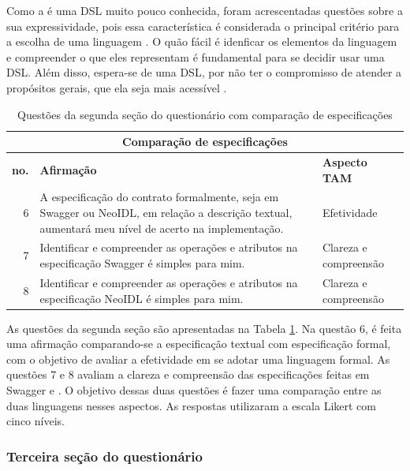 Como a \neoidl{} é uma DSL muito pouco conhecida, foram acrescentadas questões
sobre a sua expressividade, pois essa característica é considerada o principal
critério para a escolha de uma linguagem \cite{mackinlay1985expressiveness}. O
quão fácil é idenficar os elementos da linguagem e compreender o que eles
representam é fundamental para se decidir usar uma DSL. Além disso, espera-se de uma DSL, por
não ter o compromisso de atender a propósitos gerais, que ela seja mais
acessível \cite{taha2008domain}. 

\begin{table}[h]
\scriptsize
\centering
\vspace{0.5cm}
\begin{tabular}{r|p{10cm}|p{3cm}}
\multicolumn{3}{c}{{\normalsize Comparação de especificações}}\\

\hline    
\textbf{no.} &  \textbf{Afirmação} & \textbf{Aspecto TAM} \\
\hline    
6 & A especificação do contrato formalmente, seja em Swagger ou NeoIDL, em
relação a descrição textual, aumentará meu nível de acerto na implementação. &
Efetividade \\
7 & Identificar e compreender as operações e atributos na especificação Swagger
é simples para mim. & Clareza e compreensão \\
8 & Identificar e compreender as operações e atributos na especificação NeoIDL é
simples para mim. & Clareza e compreensão \\
 
\end{tabular}
\caption{Questões da segunda seção do questionário com comparação de
especificações}
\label{Secao2Questionario}
\end{table}

As questões da segunda seção são apresentadas na Tabela
\ref{Secao2Questionario}. Na questão 6, é feita uma afirmação comparando-se a
especificação textual com especificação formal, com o objetivo de avaliar a
efetividade em se adotar uma linguagem formal. As questões 7 e 8 avaliam a
clareza e compreensão das especificações feitas em Swagger e \neoidl{}. O
objetivo dessas duas questões é fazer uma comparação entre as duas linguagens
nesses aspectos. As respostas utilizaram a escala Likert \cite{allen2007likert}
com cinco níveis.


\subsubsection{Terceira seção do questionário}

